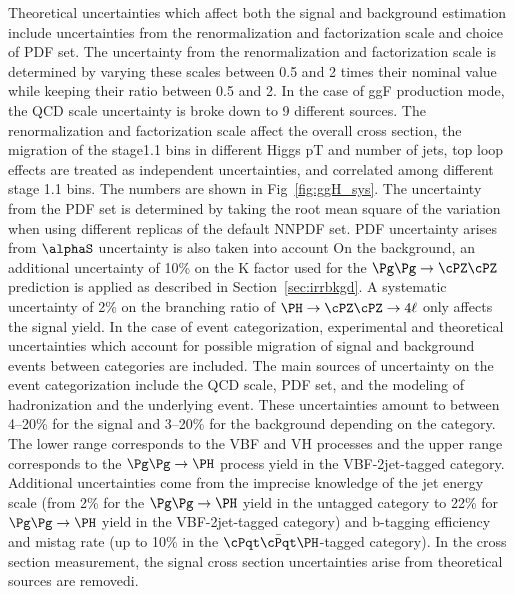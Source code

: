 Theoretical uncertainties which affect both the signal and background estimation 
include uncertainties from the renormalization and factorization scale and choice of PDF set. 
The uncertainty from the renormalization and factorization scale is determined by varying these scales between 
0.5 and 2 times their nominal value while keeping their ratio between 0.5 and 2. In the case of ggF production mode, the QCD scale uncertainty is broke down to 9 different sources. The renormalization and factorization scale affect the overall cross section, the migration of the stage1.1 bins in different Higgs pT and number of jets, top loop effects are treated as independent uncertainties, and correlated among different stage 1.1 bins. The numbers are shown in Fig~\ref{fig:ggH_sys}. 
The uncertainty from the PDF set is determined 
by taking the root mean square of the variation when using different replicas of the default NNPDF set. PDF uncertainty arises from $\alphaS$ uncertainty is also taken into account 
On the background, an additional uncertainty of 10\% on the K factor used for the $\ggZZ$ prediction is applied as described in Section~\ref{sec:irrbkgd}.
A systematic uncertainty of 2\% on the branching ratio of $\HZZfl$ only affects the signal yield. 
In the case of event categorization, experimental and theoretical uncertainties which account for
possible migration of signal and background events between categories are included. The main sources 
of uncertainty on the event categorization include the QCD scale, PDF set, and the modeling of hadronization and the underlying 
event. These uncertainties amount to between 4--20\% for the signal and 3--20\% for the background depending on the category.
The lower range corresponds to the VBF and VH processes and the upper range corresponds to the $\ggH$ process yield in the VBF-2jet-tagged category. 
Additional uncertainties come from the imprecise knowledge of the jet energy scale (from 2\% for the $\ggH$ yield in the untagged category to 22\% for  $\ggH$ yield in the VBF-2jet-tagged category) and b-tagging efficiency and mistag 
rate (up to 10\% in the $\ttH$-tagged category). 
In the cross section measurement, the signal cross section uncertainties arise from theoretical sources are removedi.

